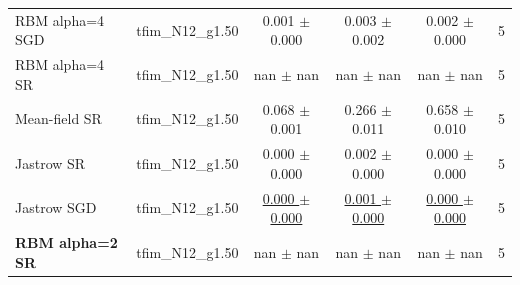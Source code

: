 \begin{tabular}{llcccc}
RBM alpha=4 SGD & tfim\_N12\_g1.50 & 0.001 $\pm$ 0.000 & 0.003 $\pm$ 0.002 & 0.002 $\pm$ 0.000 & 5 \\
RBM alpha=4 SR & tfim\_N12\_g1.50 & nan $\pm$ nan & nan $\pm$ nan & nan $\pm$ nan & 5 \\
Mean-field SR & tfim\_N12\_g1.50 & 0.068 $\pm$ 0.001 & 0.266 $\pm$ 0.011 & 0.658 $\pm$ 0.010 & 5 \\
Jastrow SR & tfim\_N12\_g1.50 & 0.000 $\pm$ 0.000 & 0.002 $\pm$ 0.000 & 0.000 $\pm$ 0.000 & 5 \\
Jastrow SGD & tfim\_N12\_g1.50 & \underline{0.000 $\pm$ 0.000} & \underline{0.001 $\pm$ 0.000} & \underline{0.000 $\pm$ 0.000} & 5 \\
\textbf{RBM alpha=2 SR} & tfim\_N12\_g1.50 & nan $\pm$ nan & nan $\pm$ nan & nan $\pm$ nan & 5 \\
\bottomrule
\end{tabular}
